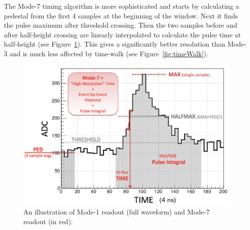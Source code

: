 \documentclass[amsmath,amssymb,notitlepage,12pt]{revtex4-1}
\begin{document}
The Mode-7 timing algorithm is more sophisticated and starts by calculating a pedestal from the first 4 samples at the beginning of the window. Next it finds the pulse maximum after threshold crossing.  Then the two samples before and after half-height crossing are linearly interpolated to calculate the pulse time at half-height (see Figure~\ref{fig:mode7}).  This gives a significantly better resolution than Mode-3 and is much less affected by time-walk (see Figure~\ref{fig:timeWalk}).
\begin{figure}[htbp]\centering\hspace{-2cm}
  \includegraphics[width=14cm]{pics/mode7.png}
  \caption{An illustration of Mode-1 readout (full waveform) and Mode-7 readout (in red).\label{fig:mode7}}
\end{figure}
\end{document}
